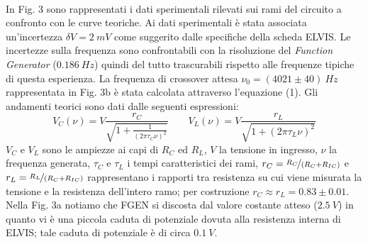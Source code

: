 \documentclass[12pt]{article}
\begin{document}
\
\\
In Fig. 3 sono rappresentati i dati sperimentali rilevati sui rami del circuito a confronto con le curve teoriche. Ai dati sperimentali 
è stata associata un'incertezza $\delta V = 2 \ mV$ come suggerito dalle specifiche della scheda ELVIS. Le incertezze sulla frequenza sono confrontabili
con la risoluzione del \textit{Function Generator} ($0.186 \ Hz $) quindi del tutto trascurabili rispetto alle frequenze tipiche di questa esperienza.
La frequenza di crossover attesa $\nu_0=(4021 \pm 40) \ Hz$ rappresentata in Fig. 3b è stata calcolata attraverso l'equazione (1).
Gli andamenti teorici sono dati dalle seguenti espressioni:
\begin{equation}
  V_C(\nu) = V\frac{r_C}{\sqrt{1+\frac{1}{(2 \pi \tau_C \nu)^2}}} \ \ \ \ \ \ \ \ \ V_L(\nu) = V\frac{r_L}{\sqrt{1+(2 \pi \tau_L \nu)^2}}
\end{equation} $V_C$ e $V_L$ sono le ampiezze ai capi di $R_C$ ed $R_L$, $V$ la tensione in ingresso, $\nu$ la frequenza generata, $\tau_C$ e $\tau_L$ i tempi caratteristici
dei rami, $r_C=\nicefrac{R_C}{(R_C+R_{IC})}$ e $r_L=\nicefrac{R_L}{(R_C+R_{IC})}$ rappresentano i rapporti tra resistenza su cui viene misurata la tensione e la resistenza 
dell'intero ramo; per costruzione $r_C \approx r_L = 0.83 \pm 0.01$. Nella Fig. 3a notiamo che FGEN si discosta dal valore costante atteso ($2.5 \ V$) in quanto vi è una piccola
caduta di potenziale dovuta alla resistenza interna di ELVIS; tale caduta di potenziale è di circa $0.1 \ V$.
\end{document}
